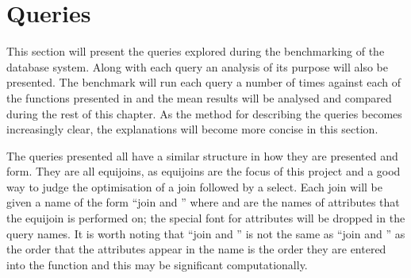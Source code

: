 \section{Queries}
This section will present the queries explored during the benchmarking of the
database system. Along with each query an analysis of its purpose will also be
presented. The benchmark will run each query a number of times against each of
the functions presented in  and the mean results
will be analysed and compared during the rest of this chapter. As the method for
describing the queries becomes increasingly clear, the explanations will become
more concise in this section.

The queries presented all have a similar structure in how they are presented and
form. They are all equijoins, as equijoins are the focus of this project and a
good way to judge the optimisation of a join followed by a select. Each join
will be given a name of the form ``join  and
'' where  and 
are the names of attributes that the equijoin is performed on; the special font
for attributes will be dropped in the query names. It is worth noting that
``join  and '' is not the same as
``join  and '' as the order that the
attributes appear in the name is the order they are entered into the function
and this may be significant computationally.

